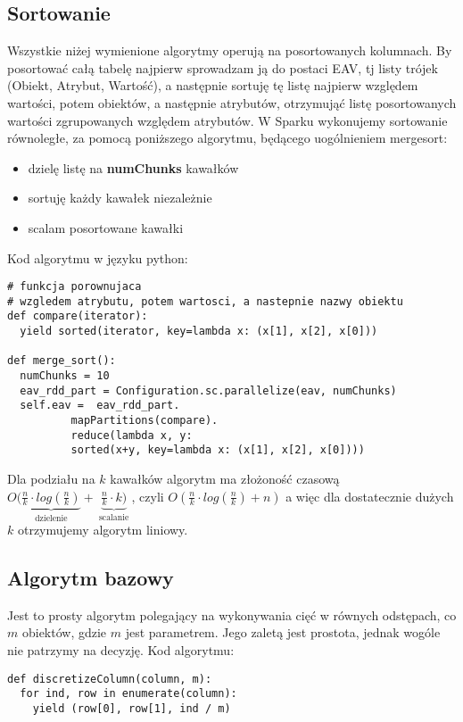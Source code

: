 \documentclass[magisterska]{pracamgr}
\theoremstyle{plain}
\theoremstyle{definition}
\theoremstyle{remark}
\begin{document}
\subsection{Sortowanie}
Wszystkie niżej wymienione algorytmy operują na posortowanych kolumnach. By posortować całą tabelę najpierw
sprowadzam ją do postaci EAV, tj listy trójek (Obiekt, Atrybut, Wartość), a następnie sortuję tę listę 
najpierw względem wartości, potem obiektów, a następnie atrybutów, otrzymująć listę posortowanych wartości
zgrupowanych względem atrybutów. W Sparku wykonujemy sortowanie równoległe, za pomocą poniższego algorytmu,
będącego uogólnieniem mergesort:
\begin{itemize}
 \item dzielę listę na \textbf{numChunks} kawałków
 \item sortuję każdy kawałek niezależnie
 \item scalam posortowane kawałki
\end{itemize}
Kod algorytmu w języku python:
\begin{lstlisting}
# funkcja porownujaca
# wzgledem atrybutu, potem wartosci, a nastepnie nazwy obiektu
def compare(iterator):
  yield sorted(iterator, key=lambda x: (x[1], x[2], x[0]))

def merge_sort():
  numChunks = 10
  eav_rdd_part = Configuration.sc.parallelize(eav, numChunks)
  self.eav =  eav_rdd_part.
	      mapPartitions(compare).
	      reduce(lambda x, y: 
	      sorted(x+y, key=lambda x: (x[1], x[2], x[0])))
\end{lstlisting}

Dla podziału na $k$ kawałków algorytm ma złożoność czasową 
$O(\underbrace{\frac{n}{k} \cdot log(\frac{n}{k})}_{\text{ dzielenie }} + \underbrace{\frac{n}{k} \cdot k)}_{\text{ scalanie }}$,
	    czyli $O(\frac{n}{k} \cdot log(\frac{n}{k}) + n)$
a więc dla dostatecznie dużych $k$ otrzymujemy algorytm liniowy.
	      
	      

\subsection{Algorytm bazowy}
Jest to prosty algorytm polegający na wykonywania cięć w równych odstępach, co $m$ obiektów, gdzie
$m$ jest parametrem.
Jego zaletą jest prostota, jednak wogóle nie patrzymy na decyzję.
Kod algorytmu:
\begin{lstlisting} 
def discretizeColumn(column, m):
  for ind, row in enumerate(column):
    yield (row[0], row[1], ind / m)
\end{lstlisting}
\end{document}
